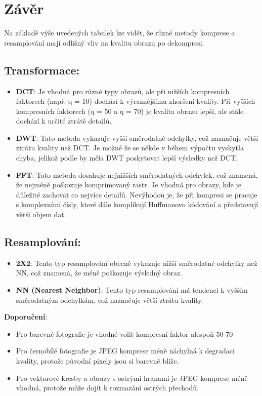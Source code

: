 \newpage
\section{Závěr}

Na základě výše uvedených tabulek lze vidět, že různé metody komprese a resamplování mají odlišný vliv na kvalitu obrazu po dekompresi.

\subsection{Transformace:}
\begin{itemize}
    \item \textbf{DCT}: Je vhodná pro různé typy obrazů, ale při nižších kompresních faktorech (např. q = 10) dochází k výraznějšímu zhoršení kvality. Při vyšších kompresních faktorech (q = 50 a q = 70) je kvalita obrazu lepší, ale stále dochází k určité ztrátě detailů.
    \item \textbf{DWT}: Tato metoda vykazuje vyšší směrodatné odchylky, což naznačuje větší ztrátu kvality než DCT. Je možné že se někde v během výpočtu vyskytla chyba, jelikož podle \cite{JPEG2000Wiki} by měla DWT poskytovat lepší výsledky než DCT.
    \item \textbf{FFT}: Tato metoda dosahuje nejnižších směrodatných odchylek, což znamená, že nejméně poškozuje komprimovaný rastr. Je vhodná pro obrazy, kde je důležité zachovat co nejvíce detailů. Nevýhodou je, že při kompresi se pracuje s komplexními čísly, které dále komplikují Huffmanovo kódování a představují větší objem dat.
\end{itemize}

\subsection{Resamplování:}
\begin{itemize}
    \item \textbf{2X2}: Tento typ resamplování obecně vykazuje nižší směrodatné odchylky než NN, což znamená, že méně poškozuje výsledný obraz.
    \item \textbf{NN (Nearest Neighbor)}: Tento typ resamplování má tendenci k vyšším směrodatným odchylkám, což naznačuje větší ztrátu kvality.
\end{itemize}

\textbf{Doporučení}:
\begin{itemize}
    \item Pro barevné fotografie je vhodné volit kompresní faktor alespoň 50-70%
    \item Pro černobílé fotografie je JPEG komprese méně náchylná k degradaci kvality, protože původní pixely jsou si barevně blíže.
    \item Pro vektorové kresby a obrazy s ostrými hranami je JPEG komprese méně vhodná, protože může dojít k rozmazání ostrých přechodů.
\end{itemize}

